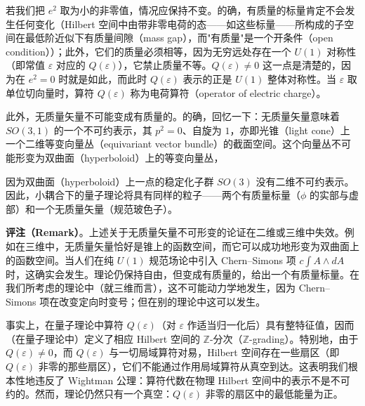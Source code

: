若我们把 $e^2$ 取为小的非零值，情况应保持不变。的确，有质量的标量肯定不会发生任何变化（Hilbert 空间中由带非零电荷的态——如这些标量——所构成的子空间在最低阶近似下有质量间隙（mass gap），而"有质量"是一个开条件（open condition））；此外，它们的质量必须相等，因为无穷远处存在一个 $U(1)$ 对称性（即常值 $\varepsilon$ 对应的 $Q(\varepsilon)$），它禁止质量不等。$Q(\varepsilon)\neq0$ 这一点是清楚的，因为在 $e^2=0$ 时就是如此，而此时 $Q(\varepsilon)$ 表示的正是 $U(1)$ 整体对称性。当 $\varepsilon$ 取单位切向量时，算符 $Q(\varepsilon)$ 称为电荷算符（operator of electric charge）。

此外，无质量矢量不可能变成有质量的。的确，回忆一下：无质量矢量意味着 $SO(3,1)$ 的一个不可约表示，其 $p^2=0$、自旋为 $1$，亦即光锥（light cone）上一个二维等变向量丛（equivariant vector bundle）的截面空间。这个向量丛不可能形变为双曲面（hyperboloid）上的等变向量丛，

因为双曲面（hyperboloid）上一点的稳定化子群 $SO(3)$ 没有二维不可约表示。因此，小耦合下的量子理论将具有同样的粒子——两个有质量标量（$\phi$ 的实部与虚部）和一个无质量矢量（规范玻色子）。


\textbf{评注（Remark）}。上述关于无质量矢量不可形变的论证在二维或三维中失效。例如在三维中，无质量矢量恰好是锥上的函数空间，而它可以成功地形变为双曲面上的函数空间。当人们在纯 $U(1)$ 规范场论中引入 Chern–Simons 项 $c\int A\wedge dA$ 时，这确实会发生。理论仍保持自由，但变成有质量的，给出一个有质量标量。在我们所考虑的理论中（就三维而言），这不可能动力学地发生，因为 Chern–Simons 项在改变定向时变号；但在别的理论中这可以发生。

事实上，在量子理论中算符 $Q(\varepsilon)$（对 $\varepsilon$ 作适当归一化后）具有整特征值，因而（在量子理论中）定义了相应 Hilbert 空间的 $\mathbb{Z}$-分次（$\mathbb{Z}$-grading）。特别地，由于 $Q(\varepsilon)\neq0$，而 $Q(\varepsilon)$ 与一切局域算符对易，Hilbert 空间存在一些扇区（即 $Q(\varepsilon)$ 非零的那些扇区），它们不能通过作用局域算符从真空到达。这表明我们根本性地违反了 Wightman 公理：算符代数在物理 Hilbert 空间中的表示不是不可约的。然而，理论仍然只有一个真空：$Q(\varepsilon)$ 非零的扇区中的最低能量为正。

